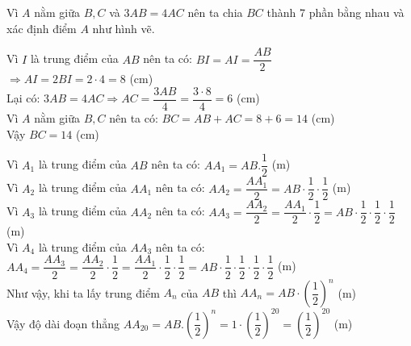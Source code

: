 \begin{Answer}{29}
		Vì $A$ nằm giữa $B,C$ và $3AB=4AC$ nên ta chia $BC$ thành 7 phần bằng nhau và xác định điểm $A$ như hình vẽ.
		\begin{center}
		\end{center}
		Vì $I$ là trung điểm của $AB$ nên ta có: $BI=AI=\dfrac{AB}{2}$\\
		$\Rightarrow AI=2BI=2\cdot4=8$ (cm)\\
		Lại có: $3AB=4AC\Rightarrow AC=\dfrac{3AB}{4}=\dfrac{3\cdot8}{4}=6$ (cm)\\
		Vì $A$ nằm giữa $B,C$ nên ta có: $BC=AB+AC=8+6=14$ (cm)\\
		Vậy $BC=14$ (cm)
	
\end{Answer}
\begin{Answer}{30}
		Vì ${{A}_{1}}$ là trung điểm của $AB$ nên ta có: $A{{A}_{1}}=AB.\dfrac{1}{2}$ (m)\\
		Vì ${{A}_{2}}$ là trung điểm của $A{{A}_{1}}$ nên ta có: $A{{A}_{2}}=\dfrac{A{{A}_{1}}}{2}=AB\cdot\dfrac{1}{2}\cdot\dfrac{1}{2}$ (m)\\
		Vì ${{A}_{3}}$ là trung điểm của $A{{A}_{2}}$ nên ta có: $A{{A}_{3}}=\dfrac{A{{A}_{2}}}{2}=\dfrac{A{{A}_{1}}}{2}\cdot\dfrac{1}{2}=AB\cdot\dfrac{1}{2}\cdot\dfrac{1}{2}\cdot\dfrac{1}{2}$ (m)\\
		Vì ${{A}_{4}}$ là trung điểm của $A{{A}_{3}}$ nên ta có: $A{{A}_{4}}=\dfrac{A{{A}_{3}}}{2}=\dfrac{A{{A}_{2}}}{2}\cdot\dfrac{1}{2}=\dfrac{A{{A}_{1}}}{2}\cdot\dfrac{1}{2}\cdot\dfrac{1}{2}=AB\cdot\dfrac{1}{2}\cdot\dfrac{1}{2}\cdot\dfrac{1}{2}\cdot\dfrac{1}{2}$ (m)\\
		Như vậy, khi ta lấy trung điểm ${{A}_{n}}$ của $AB$ thì $A{{A}_{n}}=AB\cdot{{ \left(\dfrac{1}{2} \right)}^{n}}$ (m)\\
		Vậy độ dài đoạn thẳng $A{{A}_{20}}=AB.{{\left(\dfrac{1}{2} \right)}^{n}}=1\cdot{{ \left(\dfrac{1}{2} \right)}^{20}}={{\left(\dfrac{1}{2} \right)}^{20}}$ (m)
	
\end{Answer}
